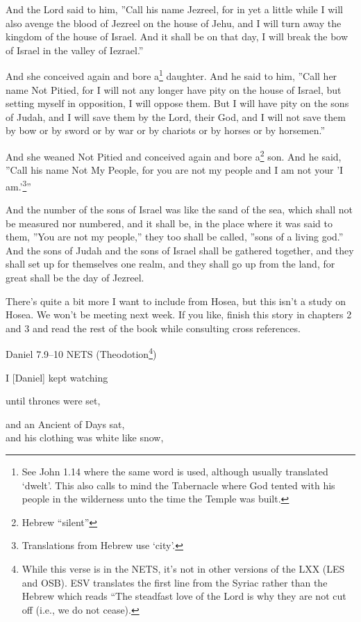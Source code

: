\documentclass[
]{article}
\newcommand{\RL}[1]{\beginR #1\endR}
\begin{document}
And the Lord said to him, \RL{''}Call his name Jezreel, for in yet a
little while I will also avenge the blood of Jezreel on the house of
Jehu, and I will turn away the kingdom of the house of Israel. And it
shall be on that day, I will break the bow of Israel in the valley of
Iezrael.''

And she conceived again and bore a\footnote{See John 1.14 where the same
  word is used, although usually translated `dwelt'. This also calls to
  mind the Tabernacle where God tented with his people in the wilderness
  unto the time the Temple was built.} daughter. And he said to him,
\RL{''}Call her name Not Pitied, for I will not any longer have pity on
the house of Israel, but setting myself in opposition, I will oppose
them. But I will have pity on the sons of Judah, and I will save them by
the Lord, their God, and I will not save them by bow or by sword or by
war or by chariots or by horses or by horsemen.''

And she weaned Not Pitied and conceived again and bore a\footnote{Hebrew
  ``silent''} son. And he said, \RL{''}Call his name Not My People, for
you are not my people and I am not your \RL{'}I am.\RL{'}\footnote{Translations
  from Hebrew use `city'.}''

And the number of the sons of Israel was like the sand of the sea, which
shall not be measured nor numbered, and it shall be, in the place where
it was said to them, \RL{''}You are not my people,'' they too shall be
called, \RL{''}sons of a living god.'' And the sons of Judah and the
sons of Israel shall be gathered together, and they shall set up for
themselves one realm, and they shall go up from the land, for great
shall be the day of Jezreel.

There's quite a bit more I want to include from Hosea, but this isn't a
study on Hosea. We won't be meeting next week. If you like, finish this
story in chapters 2 and 3 and read the rest of the book while consulting
cross references.

Daniel 7.9--10 NETS (Theodotion\footnote{While this verse is in the
  NETS, it's not in other versions of the LXX (LES and OSB). ESV
  translates the first line from the Syriac rather than the Hebrew which
  reads ``The steadfast love of the Lord is why they are not cut off
  (i.e., we do not cease).})

I {[}Daniel{]} kept watching

until thrones were set,

and an Ancient of Days sat,\\
and his clothing was white like snow,
\end{document}
